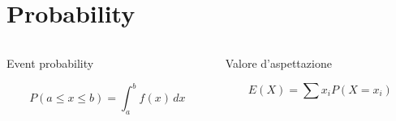 \section{Probability}

\begin{columns}

\begin{column}{0.5\textwidth}

\begin{block}{Event probability}

\begin{equation*}
P(a\leq x\leq b)=\int_a^bf(x)\,dx    
\end{equation*}

\end{block}

\end{column}

\begin{column}{0.5\textwidth}

\begin{block}{Valore d'aspettazione}

\begin{equation*}
E(X)=\sum x_iP(X=x_i)
\end{equation*}

\end{block}

\end{column}

\end{columns}